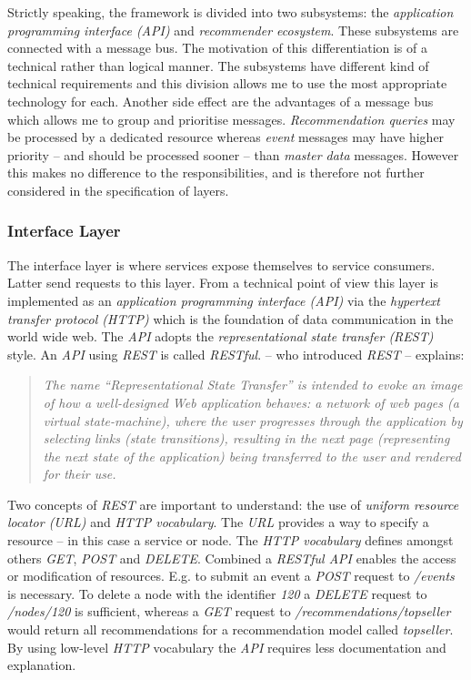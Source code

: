 Strictly speaking, the framework is divided into two subsystems: the \emph{application programming interface (API)} and \emph{recommender ecosystem}. These subsystems are connected with a message bus. The motivation of this differentiation is of a technical rather than logical manner. The subsystems have different kind of technical requirements and this division allows me to use the most appropriate technology for each. Another side effect are the advantages of a message bus which allows me to group and prioritise messages. \emph{Recommendation queries} may be processed by a dedicated resource whereas \emph{event} messages may have higher priority -- and should be processed sooner -- than \emph{master data} messages. However this makes no difference to the responsibilities, and is therefore not further considered in the specification of layers.

\subsubsection{Interface Layer}
\label{sol-design-layer-interface}

The interface layer is where services expose themselves to service consumers. Latter send requests to this layer. From a technical point of view this layer is implemented as an \emph{application programming interface (API)} via the \emph{hypertext transfer protocol (HTTP)} which is the foundation of data communication in the world wide web. The \emph{API} adopts the \emph{representational state transfer (REST)} style. An \emph{API} using \emph{REST} is called \emph{RESTful}. \citet{fielding00} -- who introduced \emph{REST} -- explains:

\begin{quotation}
    \small
    \emph{The name ``Representational State Transfer'' is intended to evoke an image of how a well-designed Web application behaves: a network of web pages (a virtual state-machine), where the user progresses through the application by selecting links (state transitions), resulting in the next page (representing the next state of the application) being transferred to the user and rendered for their use.}
\end{quotation}

Two concepts of \emph{REST} are important to understand: the use of \emph{uniform resource locator (URL)} and \emph{HTTP vocabulary}. The \emph{URL} provides a way to specify a resource -- in this case a service or node. The \emph{HTTP vocabulary} defines amongst others \emph{GET}, \emph{POST} and \emph{DELETE}. Combined a \emph{RESTful API} enables the access or modification of resources. E.g. to submit an event a \emph{POST} request to \emph{/events} is necessary. To delete a node with the identifier \emph{120} a \emph{DELETE} request to \emph{/nodes/120} is sufficient, whereas a \emph{GET} request to \emph{/recommendations/topseller} would return all recommendations for a recommendation model called \emph{topseller}. By using low-level \emph{HTTP} vocabulary the \emph{API} requires less documentation and explanation.

